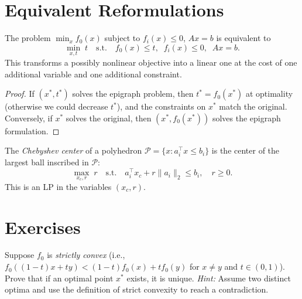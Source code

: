 \documentclass[11pt,a4paper]{article}
\begin{document}

\section{Equivalent Reformulations}\label{sec:reformulations}

\begin{proposition}\label{prop:epigraph}
The problem $\min_{x} f_0(x)$ subject to $f_i(x) \le 0$, $Ax = b$
is equivalent to
\[
  \min_{x, t} \; t \quad \text{s.t.} \quad f_0(x) \le t, \;\;
  f_i(x) \le 0, \;\; Ax = b.
\]
This transforms a possibly nonlinear objective into a linear one at the cost
of one additional variable and one additional constraint.
\end{proposition}

\begin{proof}
If $(x^*, t^*)$ solves the epigraph problem, then $t^* = f_0(x^*)$ at
optimality (otherwise we could decrease $t^*$), and the constraints on $x^*$
match the original. Conversely, if $x^*$ solves the original, then
$(x^*, f_0(x^*))$ solves the epigraph formulation.
\end{proof}

\begin{example}\label{ex:chebyshev}
The \emph{Chebyshev center} of a polyhedron $\mathcal{P} = \{x : a_i^\top x \le b_i\}$
is the center of the largest ball inscribed in $\mathcal{P}$:
\[
  \max_{x_c, r} \; r \quad \text{s.t.} \quad a_i^\top x_c + r\|a_i\|_2 \le b_i,
  \quad r \ge 0.
\]
This is an LP in the variables $(x_c, r)$.
\end{example}


\section{Exercises}\label{sec:exercises}

\begin{exercise}\label{ex:unique}
Suppose $f_0$ is \emph{strictly convex} (i.e.,
$f_0((1-t)x + ty) < (1-t)f_0(x) + tf_0(y)$ for $x \neq y$ and
$t \in (0,1)$). Prove that if an optimal point $x^*$ exists, it is unique.
\emph{Hint:} Assume two distinct optima and use the definition of strict
convexity to reach a contradiction.
\end{exercise}
\end{document}
